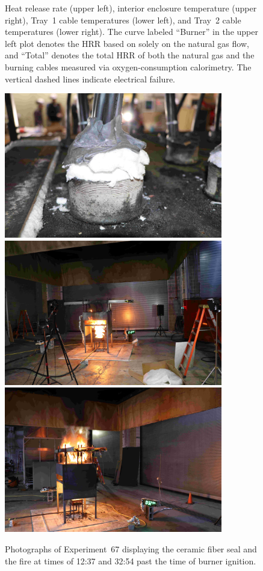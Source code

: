 \begin{figure}[H]
\caption[HRR and temperatures of Experiment 67]{Heat release rate (upper left), interior enclosure temperature (upper right), Tray~1 cable temperatures (lower left), and Tray~2 cable temperatures (lower right). The curve labeled ``Burner'' in the upper left plot denotes the HRR based on solely on the natural gas flow, and ``Total'' denotes the total HRR of both the natural gas and the burning cables measured via oxygen-consumption calorimetry. The vertical dashed lines indicate electrical failure.}
\label{fig:Test_67}
\end{figure}

\begin{figure}[p]
\centering
\includegraphics[height=2.50in]{../FIGURES/Test_67_Photo_1} \\ \vspace{0.1in}
\includegraphics[height=2.50in]{../FIGURES/Test_67_Photo_2} \\ \vspace{0.1in}
\includegraphics[height=2.50in]{../FIGURES/Test_67_Photo_3}
\caption[Photographs of Experiment~67]{Photographs of Experiment~67 displaying the ceramic fiber seal and the fire at times of 12:37 and 32:54 past the time of burner ignition.}
\label{fig:Test_67_photos}
\end{figure}




